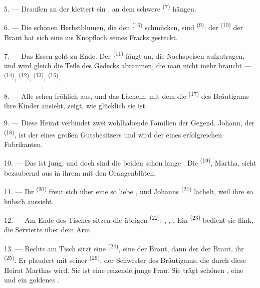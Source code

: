 5. --- Draußen an der  klettert ein , an
dem schwere  \textsuperscript{(7)} hängen.

6. --- Die schönen Herbstblumen, die den  \textsuperscript{(16)}
schmücken, sind  \textsuperscript{(9)}; der 
\textsuperscript{(10)} der Braut hat sich eine ins Knopfloch seines Fracks gesteckt.

7. --- Das Essen geht zu Ende. Der  \textsuperscript{(11)} fängt an,
die Nachspeisen aufzutragen, und wird gleich die Teile des Gedecks abräumen, die
man nicht mehr braucht ---  \textsuperscript{(14)},
 \textsuperscript{(12)},  \textsuperscript{(13)},
 \textsuperscript{(15)}.

\VUsaut{3.0mm}

8. --- Alle sehen fröhlich aus, und das Lächeln, mit dem die 
\textsuperscript{(17)} des Bräutigams ihre Kinder ansieht, zeigt, wie glücklich sie
ist.

9. --- Diese Heirat verbindet zwei wohlhabende Familien der Gegend. Johann, der
 \textsuperscript{(18)}, ist der  eines großen
Gutsbesitzers und wird der  eines erfolgreichen
Fabrikanten.

10. --- Das  ist jung, und doch sind die beiden schon lange
. Die  \textsuperscript{(19)}, Martha, sieht
bezaubernd aus in ihrem  mit den Orangenblüten.

11. --- Ihr  \textsuperscript{(20)} freut sich über eine so
liebe , und Johanns 
\textsuperscript{(21)} lächelt, weil ihre  so hübsch aussieht.

12. --- Am Ende des Tisches sitzen die übrigen 
\textsuperscript{(22)}: , , . Ein
 \textsuperscript{(23)} bedient sie flink, die Serviette über dem
Arm.

\VUsaut{3.0mm}

13. --- Rechts am Tisch sitzt eine  \textsuperscript{(24)}, eine
 der Braut, dann der  der Braut, ihr
 \textsuperscript{(25)}. Er plaudert mit seiner
 \textsuperscript{(26)}, der Schwester des Bräutigams, die durch
diese Heirat Marthas  wird. Sie ist eine reizende junge Frau.
Sie trägt schönen , eine  und ein goldenes
.

